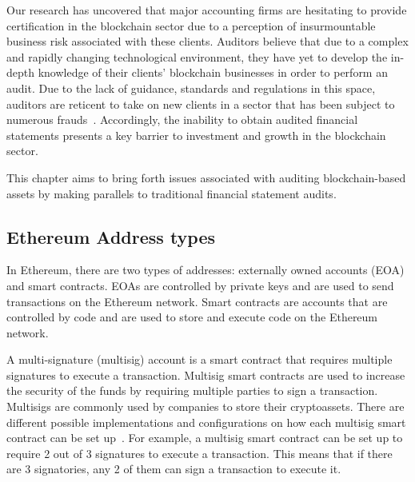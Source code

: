 Our research has uncovered that major accounting firms are hesitating to provide certification in the blockchain sector due to a perception of insurmountable business risk associated with these clients. Auditors believe that due to a complex and rapidly changing technological environment, they have yet to develop the in-depth knowledge of their clients' blockchain businesses in order to perform an audit. Due to the lack of guidance, standards and regulations in this space, auditors are reticent to take on new clients in a sector that has been subject to numerous frauds~\cite{abreu2018blockchain}. Accordingly, the inability to obtain audited financial statements presents a key barrier to investment and growth in the blockchain sector.


This chapter aims to bring forth issues associated with auditing blockchain-based assets by making parallels to traditional financial statement audits. 




\subsection{Ethereum Address types}
In Ethereum, there are two types of addresses: externally owned accounts (EOA) and smart contracts. EOAs are controlled by private keys and are used to send transactions on the Ethereum network. Smart contracts are accounts that are controlled by code and are used to store and execute code on the Ethereum network. 



A multi-signature (multisig) account is a smart contract that requires multiple signatures to execute a transaction. Multisig smart contracts are used to increase the security of the funds by requiring multiple parties to sign a transaction. Multisigs are commonly used by companies to store their cryptoassets. There are different possible implementations and configurations on how each multisig smart contract can be set up~\cite{ittay2021wallet}. For example, a multisig smart contract can be set up to require 2 out of 3 signatures to execute a transaction. This means that if there are 3 signatories, any 2 of them can sign a transaction to execute it.

